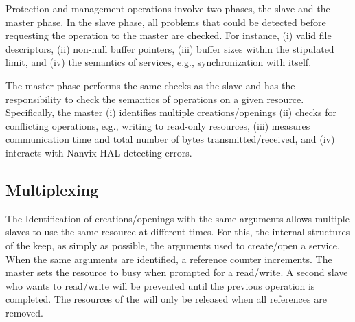 
			Protection and management operations involve two phases, the slave and the master phase.
			In the slave phase, all problems that could be detected before requesting the operation
			to the master are checked.
			For instance,
			(i) valid file descriptors,
			(ii) non-null buffer pointers,
			(iii) buffer sizes within the stipulated limit, and
			(iv) the semantics of services, e.g., synchronization with itself.

			The master phase performs the same checks as the slave and has the
			responsibility to check the semantics of operations on a given resource.
			Specifically, the master
			(i) identifies multiple creations/openings
			(ii) checks for conflicting operations, e.g., writing to read-only resources,
			(iii) measures communication time and total number of bytes transmitted/received, and
			(iv) interacts with Nanvix HAL detecting errors.

		\subsection{Multiplexing}


			The Identification of creations/openings with the same arguments
			allows multiple slaves to use the same resource at different times.
			For this, the internal structures of the \os keep, as simply as possible,
			the arguments used to create/open a service. When the same arguments are
			identified, a reference counter increments. The master sets the resource
			to busy when prompted for a read/write. A second slave who wants to read/write
			 will be prevented until the previous operation is completed. The resources
			 of the \hal will only be released when all references are removed.

